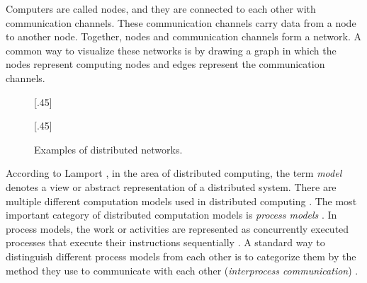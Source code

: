 Computers are called nodes, and they are connected to each other with communication channels.
These communication channels carry data from a node to another node.
Together, nodes and communication channels form a network.
A common way to visualize these networks is by drawing a graph in which the nodes represent computing nodes and edges represent the communication channels.
\cite{HirvonenSuomelaDistAlg2020}


\begin{figure}[H]
    [.45\linewidth] {
    \centering
  }
  \hfill
    [.45\linewidth] {
    \centering
  }
  \caption{Examples of distributed networks.}
  \label{fig:dist_comp1}
\end{figure}
According to Lamport \cite{DBLP:books/el/leeuwen90/LamportL90}, in the area of distributed computing, the term \emph{model} denotes a view or abstract representation of a distributed system.
There are multiple different computation models used in distributed computing \cite{DBLP:books/el/leeuwen90/LamportL90}.
The most important category of distributed computation models is \emph{process models} \cite{DBLP:books/el/leeuwen90/LamportL90}.
In process models, the work or activities are represented as concurrently executed processes that execute their instructions sequentially \cite{DBLP:books/el/leeuwen90/LamportL90}.
A standard way to distinguish different process models from each other is to categorize them by the method they use to communicate with each other (\emph{interprocess communication}) \cite{DBLP:books/el/leeuwen90/LamportL90}.


